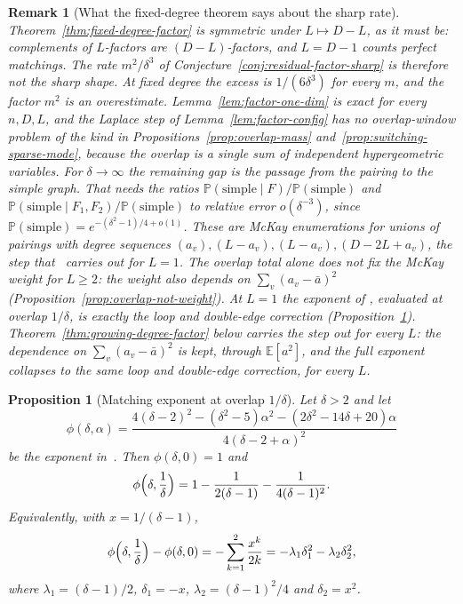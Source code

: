 \documentclass[11pt]{article}
\newtheorem{proposition}[theorem]{Proposition}
\newtheorem{remark}[theorem]{Remark}
\newcommand{\EE}{\mathbb{E}}
\newcommand{\PP}{\mathbb{P}}
\begin{document}
\begin{remark}[What the fixed-degree theorem says about the sharp rate]
\label{rem:fixed-degree-sharp}
Theorem~\ref{thm:fixed-degree-factor} is symmetric under \(L\mapsto D-L\),
as it must be: complements of \(L\)-factors are \((D-L)\)-factors, and
\(L=D-1\) counts perfect matchings. The rate
\(m^2/\delta^3\) of Conjecture~\ref{conj:residual-factor-sharp} is therefore not
the sharp shape. At fixed degree the excess is \(1/(6\delta^3)\) for every
\(m\), and the factor \(m^2\) is an overestimate.
Lemma~\ref{lem:factor-one-dim} is exact for every \(n,D,L\), and the Laplace step
of Lemma~\ref{lem:factor-config} has no overlap-window problem of the kind in
Propositions~\ref{prop:overlap-mass} and~\ref{prop:switching-sparse-mode},
because the overlap is a single sum of independent hypergeometric variables.
For \(\delta\to\infty\) the remaining gap is the passage from the pairing to
the simple graph. That needs the ratios
\(\PP(\text{simple}\mid F)/\PP(\text{simple})\) and
\(\PP(\text{simple}\mid F_1,F_2)/\PP(\text{simple})\) to relative error
\(o(\delta^{-3})\), since \(\PP(\text{simple})=e^{-(\delta^2-1)/4+o(1)}\).
These are McKay enumerations for unions of pairings with degree sequences
\((a_v),(L-a_v),(L-a_v),(D-2L+a_v)\), the step that~\cite{Gao21} carries out
for \(L=1\).
The overlap total alone does not fix the McKay weight for \(L\ge 2\): the
weight also depends on \(\sum_v(a_v-\bar a)^2\)
(Proposition~\ref{prop:overlap-not-weight}). At \(L=1\) the exponent of
\cite[Corollary~15]{Gao21}, evaluated at overlap \(1/\delta\), is exactly the
loop and double-edge correction
(Proposition~\ref{prop:mode-phi}).
Theorem~\ref{thm:growing-degree-factor} below carries the step out for every
\(L\): the dependence on \(\sum_v(a_v-\bar a)^2\) is kept, through
\(\EE[a^2]\), and the full exponent collapses to the same loop and
double-edge correction, for every \(L\).
\end{remark}

\begin{proposition}[Matching exponent at overlap \(1/\delta\)]
\label{prop:mode-phi}
Let \(\delta>2\) and let
\[
\phi(\delta,\alpha)
=
\frac{4(\delta-2)^2-(\delta^2-5)\alpha^2-(2\delta^2-14\delta+20)\alpha}
{4(\delta-2+\alpha)^2}
\]
be the exponent in~\cite[Corollary~15]{Gao21}. Then \(\phi(\delta,0)=1\) and
\[
\phi\Bigl(\delta,\frac1\delta\Bigr)
=
1-\frac1{2(\delta-1)}-\frac1{4(\delta-1)^2}.
\]
Equivalently, with \(x=1/(\delta-1)\),
\[
\phi\Bigl(\delta,\frac1\delta\Bigr)-\phi(\delta,0)
=
-\sum_{k=1}^{2}\frac{x^k}{2k}
=
-\lambda_1\delta_1^2-\lambda_2\delta_2^2,
\]
where \(\lambda_1=(\delta-1)/2\), \(\delta_1=-x\), \(\lambda_2=(\delta-1)^2/4\) and
\(\delta_2=x^2\).
\end{proposition}
\end{document}

